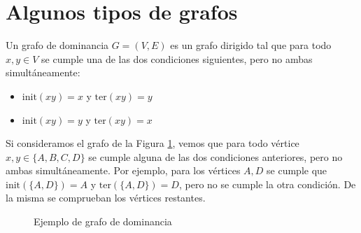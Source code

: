 \section{Algunos tipos de grafos}

\begin{defi}
Un grafo de dominancia $G=(V,E)$ es un grafo dirigido tal que para todo $x,y \in V$ se cumple una de las dos condiciones siguientes, pero no ambas simultáneamente:

\begin{itemize}
\item $\mathrm{init}(xy) = x$ \quad y \quad $\mathrm{ter}(xy) = y$
\item $\mathrm{init}(xy) = y$ \quad y \quad $\mathrm{ter}(xy) = x$ 
\end{itemize}
\end{defi}

\begin{ejemplo}
Si consideramos el grafo de la Figura \ref{fig:grafo_dominancia}, vemos que para todo vértice $x,y \in \{A, B, C, D\}$ se cumple alguna de las dos condiciones anteriores, pero no ambas simultáneamente. Por ejemplo, para los vértices $A, D$ se cumple que $\mathrm{init}(\{A,D\}) = A$ y $\mathrm{ter}(\{A,D\}) = D$, pero no se cumple la otra condición. De la misma se comprueban los vértices restantes.   

\begin{figure}[h]
\centering
\ejemplografodominancia
\caption{Ejemplo de grafo de dominancia}
\label{fig:grafo_dominancia}
\end{figure}
\end{ejemplo}